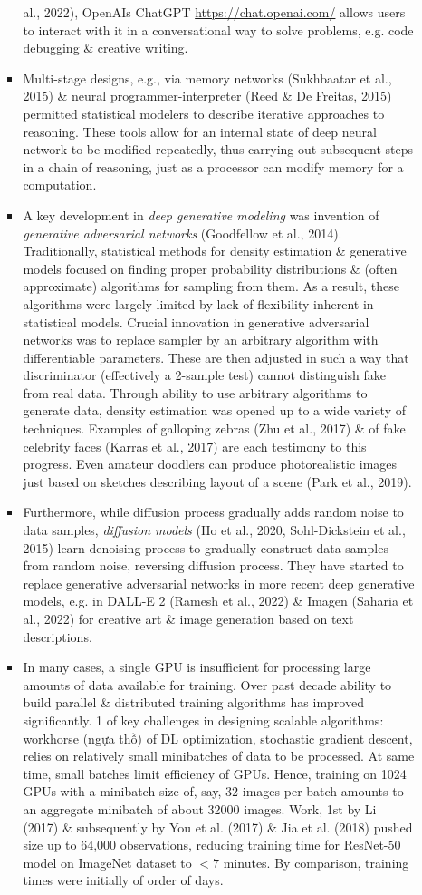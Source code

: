 \documentclass{article}
\begin{document}
\begin{itemize}
\begin{itemize}
\begin{itemize}
			al., 2022), OpenAIs ChatGPT \url{https://chat.openai.com/} allows users to interact with it in a conversational way to solve problems, e.g. code debugging \& creative writing.
			\item Multi-stage designs, e.g., via memory networks (Sukhbaatar et al., 2015) \& neural programmer-interpreter (Reed \& De Freitas, 2015) permitted statistical modelers to describe iterative approaches to reasoning. These tools allow for an internal state of deep neural network to be modified repeatedly, thus carrying out subsequent steps in a chain of reasoning, just as a processor can modify memory for a computation.
			\item A key development in {\it deep generative modeling} was invention of {\it generative adversarial networks} (Goodfellow et al., 2014). Traditionally, statistical methods for density estimation \& generative models focused on finding proper probability distributions \& (often approximate) algorithms for sampling from them. As a result, these algorithms were largely limited by lack of flexibility inherent in statistical models. Crucial innovation in generative adversarial networks was to replace sampler by an arbitrary algorithm with differentiable parameters. These are then adjusted in such a way that discriminator (effectively a 2-sample test) cannot distinguish fake from real data. Through ability to use arbitrary algorithms to generate data, density estimation was opened up to a wide variety of techniques. Examples of galloping zebras (Zhu et al., 2017) \& of fake celebrity faces (Karras et al., 2017) are each testimony to this progress. Even amateur doodlers can produce photorealistic images just based on sketches describing layout of a scene (Park et al., 2019).
			\item Furthermore, while diffusion process gradually adds random noise to data samples, {\it diffusion models} (Ho et al., 2020, Sohl-Dickstein et al., 2015) learn denoising process to gradually construct data samples from random noise, reversing diffusion process. They have started to replace generative adversarial networks in more recent deep generative models, e.g. in DALL-E 2 (Ramesh et al., 2022) \& Imagen (Saharia et al., 2022) for creative art \& image generation based on text descriptions.
			\item In many cases, a single GPU is insufficient for processing large amounts of data available for training. Over past decade ability to build parallel \& distributed training algorithms has improved significantly. 1 of key challenges in designing scalable algorithms: workhorse (ngựa thồ) of DL optimization, stochastic gradient descent, relies on relatively small minibatches of data to be processed. At same time, small batches limit efficiency of GPUs. Hence, training on 1024 GPUs with a minibatch size of, say, 32 images per batch amounts to an aggregate minibatch of about 32000 images. Work, 1st by Li (2017) \& subsequently by You et al. (2017) \& Jia et al. (2018) pushed size up to 64,000 observations, reducing training time for ResNet-50 model on ImageNet dataset to $< 7$ minutes. By comparison, training times were initially of order of days.

\end{itemize}
\end{itemize}
\end{itemize}
\end{document}
